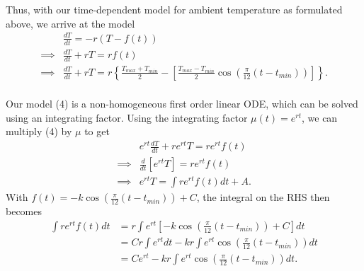 \documentclass{article}
\begin{document}
Thus, with our time-dependent model for ambient temperature as formulated above, we arrive at the model
\begin{align*}
&\frac{dT}{dt} = -r(T-f(t))\\
\implies &\frac{dT}{dt} + rT = rf(t)\\
\implies &\frac{dT}{dt}+rT=r\left\{\frac{T_{max}+T_{min}}{2} -\left[\frac{T_{max}-T_{min}}{2}\cos\left(\frac{\pi}{12}(t-t_{min})\right)\right]\right\}.\tag{4}\\
\end{align*}


Our model (4) is a non-homogeneous first order linear ODE, which can be solved using an integrating factor. Using the integrating factor \(\mu(t)=e^{rt}\), we can multiply (4) by \(\mu\) to get
\begin{align*}
    &e^{rt}\frac{dT}{dt} + re^{rt}T = re^{rt}f(t)\\
    \implies &\frac{d}{dt} [e^{rt}T] = re^{rt}f(t)\\
    \implies &e^{rt}T = \int re^{rt}f(t) dt + A. \tag{5}
\end{align*}
With \(f(t) = -k\cos(\frac{\pi}{12}(t-t_{min})) +C \), the integral on the RHS then becomes
\begin{align*}
    \int re^{rt}f(t)dt &= r\int e^{rt}\left[-k\cos\left(\frac{\pi}{12}(t-t_{min})\right)+C\right]dt\\
    &=Cr\int e^{rt}dt-kr\int e^{rt}\cos\left(\frac{\pi}{12}(t-t_{min})\right)dt\\
    &=Ce^{rt} - kr\int e^{rt}\cos\left(\frac{\pi}{12}(t-t_{min})\right)dt \tag{6}.
\end{align*}
\end{document}
